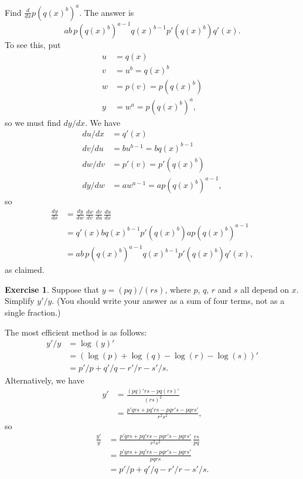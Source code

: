 \documentclass[a4paper]{book}
\theoremstyle{definition}
\newtheorem{exercise}[theorem]{Exercise}
\newenvironment{starex}{
 \renewcommand{\thetheorem}{\arabic{chapter}.\arabic{section}.\arabic{theorem}${}^*$}
 \exercise
}{\endexercise}
\renewenvironment{solution}{\SolutionInline}{\endSolutionInline}
\begin{document}
\begin{starex}
 Find $\frac{d}{dx}p(q(x)^b)^a$.
\end{starex}
\begin{solution}
 The answer is 
 \[ ab\, p(q(x)^b)^{a-1} q(x)^{b-1} p'(q(x)^b) q'(x). \]
 To see this, put
 \begin{align*}
  u &= q(x) \\
  v &= u^b = q(x)^b \\
  w &= p(v) = p(q(x)^b) \\
  y &= w^a = p(q(x)^b)^a,
 \end{align*}
 so we must find $dy/dx$.  We have
 \begin{align*}
  du/dx &= q'(x) \\
  dv/du &= bu^{b-1} = b q(x)^{b-1} \\
  dw/dv &= p'(v) = p'(q(x)^b) \\
  dy/dw &= a w^{a-1} = a p(q(x)^b)^{a-1},
 \end{align*}
 so 
 \begin{align*}
  \frac{dy}{dx} &= \frac{dy}{dw}\,\frac{dw}{dv}\,
                   \frac{dv}{du}\,\frac{du}{dx} \\
   &= q'(x) b q(x)^{b-1} p'(q(x)^b) a p(q(x)^b)^{a-1} \\
   &= ab\, p(q(x)^b)^{a-1} q(x)^{b-1} p'(q(x)^b) q'(x),
 \end{align*}
 as claimed.
\end{solution}

\begin{exercise}
 Suppose that $y=(pq)/(rs)$, where $p$, $q$, $r$ and $s$ all depend on
 $x$.  Simplify $y'/y$.  (You should write your answer as a sum of
 four terms, not as a single fraction.)
\end{exercise}
\begin{solution}
 The most efficient method is as follows:
 \begin{align*}
  y'/y &= \log(y)' \\
       &= (\log(p)+\log(q)-\log(r)-\log(s))' \\
       &= p'/p + q'/q - r'/r - s'/s.
 \end{align*}
 Alternatively, we have
 \begin{align*}
  y' &= \frac{(pq)'rs - pq(rs)'}{(rs)^2} \\
     &= \frac{p'qrs + pq'rs - pqr's - pqrs'}{r^2s^2},
 \end{align*}
 so
 \begin{align*}
  \frac{y'}{y} &= 
   \frac{p'qrs + pq'rs - pqr's - pqrs'}{r^2s^2} \, \frac{rs}{pq} \\
   &= \frac{p'qrs + pq'rs - pqr's - pqrs'}{pqrs} \\
   &= p'/p + q'/q - r'/r - s'/s.
 \end{align*}
\end{solution}
\end{document}
